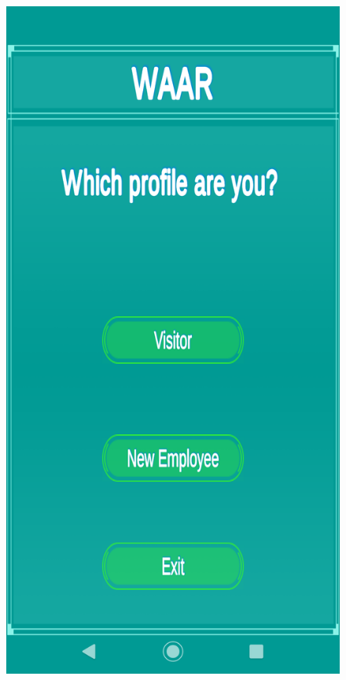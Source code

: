 \documentclass{aifyp}
\begin{document}
\begin{appendices}
\begin{figure}[H]
\begin{minipage}{.5\textwidth}
          \label{fig:MainMenu}
        \end{minipage}%
        \begin{minipage}{.5\textwidth}
          \centering
          \includegraphics[scale=0.2]{Images/Chapter5/Impl2.png}

\end{minipage}
\end{figure}
\end{appendices}
\end{document}
